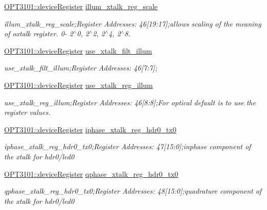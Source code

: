 \begin{DoxyCompactItemize}
\mbox{\hyperlink{class_o_p_t3101_1_1device_register}{O\+P\+T3101\+::device\+Register}} \mbox{\hyperlink{class_o_p_t3101_1_1registers_a92394965d2a4ebd5a540ae43a9a19403}{illum\+\_\+xtalk\+\_\+reg\+\_\+scale}}
\begin{DoxyCompactList}\small\item\em illum\+\_\+xtalk\+\_\+reg\+\_\+scale;Register Addresses\+: 46\mbox{[}19\+:17\mbox{]};allows scaling of the meaning of oxtalk register. 0-\/ 2$^\wedge$0, 2$^\wedge$2, 2$^\wedge$4, 2$^\wedge$8. \end{DoxyCompactList}\item 
\mbox{\hyperlink{class_o_p_t3101_1_1device_register}{O\+P\+T3101\+::device\+Register}} \mbox{\hyperlink{class_o_p_t3101_1_1registers_a9096cc1e59abbb9f3c021e1a9f48e254}{use\+\_\+xtalk\+\_\+filt\+\_\+illum}}
\begin{DoxyCompactList}\small\item\em use\+\_\+xtalk\+\_\+filt\+\_\+illum;Register Addresses\+: 46\mbox{[}7\+:7\mbox{]}; \end{DoxyCompactList}\item 
\mbox{\hyperlink{class_o_p_t3101_1_1device_register}{O\+P\+T3101\+::device\+Register}} \mbox{\hyperlink{class_o_p_t3101_1_1registers_ac7e814f9c862979bd9134cbe3cd740d1}{use\+\_\+xtalk\+\_\+reg\+\_\+illum}}
\begin{DoxyCompactList}\small\item\em use\+\_\+xtalk\+\_\+reg\+\_\+illum;Register Addresses\+: 46\mbox{[}8\+:8\mbox{]};For optical default is to use the register values. \end{DoxyCompactList}\item 
\mbox{\hyperlink{class_o_p_t3101_1_1device_register}{O\+P\+T3101\+::device\+Register}} \mbox{\hyperlink{class_o_p_t3101_1_1registers_a08d4c916abb826b6bb45114cca2ebe96}{iphase\+\_\+xtalk\+\_\+reg\+\_\+hdr0\+\_\+tx0}}
\begin{DoxyCompactList}\small\item\em iphase\+\_\+xtalk\+\_\+reg\+\_\+hdr0\+\_\+tx0;Register Addresses\+: 47\mbox{[}15\+:0\mbox{]};inphase component of the xtalk for hdr0/led0 \end{DoxyCompactList}\item 
\mbox{\hyperlink{class_o_p_t3101_1_1device_register}{O\+P\+T3101\+::device\+Register}} \mbox{\hyperlink{class_o_p_t3101_1_1registers_a37008e1b0c91614c3aa483d683d20f93}{qphase\+\_\+xtalk\+\_\+reg\+\_\+hdr0\+\_\+tx0}}
\begin{DoxyCompactList}\small\item\em qphase\+\_\+xtalk\+\_\+reg\+\_\+hdr0\+\_\+tx0;Register Addresses\+: 48\mbox{[}15\+:0\mbox{]};quadrature component of the xtalk for hdr0/led0 \end{DoxyCompactList}\item 

\end{DoxyCompactItemize}
